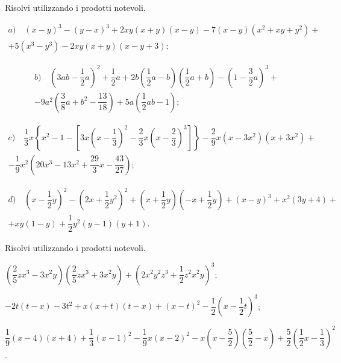 \begin{esercizio}[\Ast]
 \label{ese:12.40}
Risolvi utilizzando i prodotti notevoli.

 \begin{multline*}
 a)\quad (x-y)^{3}-(y-x)^{3}+2{xy}(x+y)(x-y)-7(x-y)\left(x^{2}+{xy}+y^{2}\right)+\\
 +5\left(x^{3}-y^{3}\right)-2{xy}(x+y)(x-y+3);
 \end{multline*}

 \begin{multline*}
b)\quad \left(3ab-\dfrac{1}{2}a\right)^{2}+\dfrac{1}{2}a+2b\left(\dfrac{1}{2}a-b\right)\left(\dfrac{1}{2}a+b\right)-\left(1-\dfrac{3}{2}a\right)^{3}+\\
 -9a^{2}\left(\dfrac{3}{8}a+b^{2}-\dfrac{13}{18}\right)+5a\left(\dfrac{1}{2}{ab}-1\right);
 \end{multline*}

 \begin{multline*}
c)\quad \dfrac{1}{3}x\left\{x^{2}-1-\left[3x\left(x-\dfrac{1}{3}\right)^{2}-\dfrac{2}{3}x\left(x-\dfrac{2}{3}\right)^{3}\right]\right\}-\dfrac{2}{9}x\left(x-3x^{2}\right)\left(x+3x^{2}\right)+\\
 -\dfrac{1}{9}x^{2}\left(20x^{3}-13x^{2}+\dfrac{29}{3}x-\dfrac{43}{27}\right);
 \end{multline*}

 \begin{multline*}
d)\quad \left(x-\dfrac{1}{2}y\right)^{2}-\left(2x+\dfrac{1}{2}y^{2}\right)^{2}+\left(x+\dfrac{1}{2}y\right)\left(-x+\dfrac{1}{2}y\right)+(x-y)^{3}+x^{2}(3y+4)+\\
 +xy(1-y)+\dfrac{1}{2}y^{2}(y-1)(y+1).
 \end{multline*}
\end{esercizio}
\pagebreak
\begin{esercizio}
 \label{ese:12.41}
Risolvi utilizzando i prodotti notevoli.
 \begin{enumeratea}
 \item $\left(\dfrac{2}{5}zx^{3}-3x^{2}y\right)\left(\dfrac{2}{5}zx^{3}+3x^{2}y\right)+\left(2x^{2}y^{2}z^{3}+\dfrac{1}{2}z^{2}x^{2}y\right)^{3}$;
 \item $-2t(t-x)-3t^{2}+x(x+t)(t-x)+(x-t)^{2}-\dfrac{1}{2}\left(x-\dfrac{1}{2}t\right)^{3}$;
 \item $\dfrac{1}{9}(x-4)(x+4)+\dfrac{1}{3}(x-1)^{2}-\dfrac{1}{9}x(x-2)^{2}-x\left(x-\dfrac{5}{2}\right)\left(\dfrac{5}{2}-x\right)+\dfrac{5}{2}\left(\dfrac{1}{2}x-\dfrac{1}{3}\right)^{2}$.
 \end{enumeratea}
\end{esercizio}

